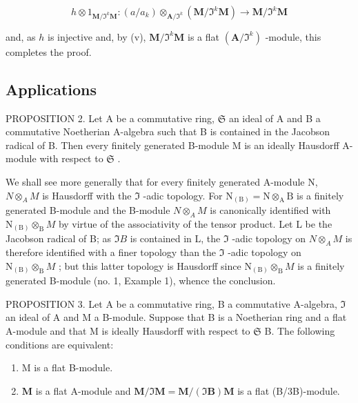 \[
h \otimes 1 _ {\mathbf {M} / \Im^ {k} \mathbf {M}}: (a / a _ {k}) \otimes_ {\mathbf {A} / \Im^ {k}} (\mathbf {M} / \Im^ {k} \mathbf {M}) \rightarrow \mathbf {M} / \Im^ {k} \mathbf {M}
\]

and, as \(h\) is injective and, by (v), \(\mathbf{M} / \Im^k\mathbf{M}\) is a flat \((\mathbf{A} / \Im^k)\) -module, this completes the proof.

\subsection{Applications}

PROPOSITION 2. Let A be a commutative ring, \(\mathfrak{S}\) an ideal of A and B a commutative Noetherian A-algebra such that B is contained in the Jacobson radical of B. Then every finitely generated B-module M is an ideally Hausdorff A-module with respect to \(\mathfrak{S}\) .

We shall see more generally that for every finitely generated A-module N, \(N \otimes_{A} M\) is Hausdorff with the \(\Im\) -adic topology. For \(\mathrm{N}_{(\mathrm{B})} = \mathrm{N} \otimes_{\mathrm{A}} \mathrm{B}\) is a finitely generated B-module and the B-module \(N \otimes_{A} M\) is canonically identified with \(\mathrm{N}_{(\mathrm{B})} \otimes_{\mathrm{B}} M\) by virtue of the associativity of the tensor product. Let L be the Jacobson radical of B; as \(\Im B\) is contained in L, the \(\Im\) -adic topology on \(N \otimes_{A} M\) is therefore identified with a finer topology than the \(\Im\) -adic topology on \(\mathrm{N}_{(\mathrm{B})} \otimes_{\mathrm{B}} M\) ; but this latter topology is Hausdorff since \(\mathrm{N}_{(\mathrm{B})} \otimes_{\mathrm{B}} M\) is a finitely generated B-module (no. 1, Example 1), whence the conclusion.

PROPOSITION 3. Let A be a commutative ring, B a commutative A-algebra, \(\mathfrak{I}\) an ideal of A and M a B-module. Suppose that B is a Noetherian ring and a flat A-module and that M is ideally Hausdorff with respect to \(\mathfrak{S}\) B. The following conditions are equivalent:

\begin{enumerate}
\def\labelenumi{(\alph{enumi})}
\item
  M is a flat B-module.
\item
  \(\mathbf{M}\) is a flat A-module and \(\mathbf{M} / \Im \mathbf{M} = \mathbf{M} / (\Im \mathbf{B})\mathbf{M}\) is a flat (B/3B)-module.
\end{enumerate}

